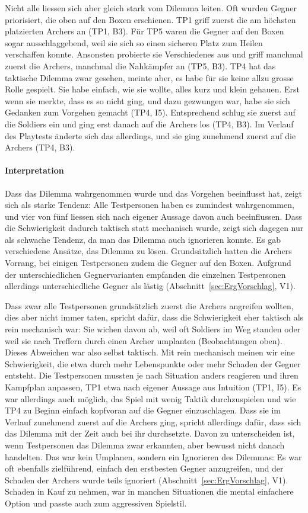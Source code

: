 \documentclass[../Main.tex]{subfiles}
\begin{document}
Nicht alle liessen sich aber gleich stark vom Dilemma leiten. Oft wurden Gegner priorisiert, die oben auf den Boxen erschienen. TP1 griff zuerst die am höchsten platzierten Archers an (TP1, B3). Für TP5 waren die Gegner auf den Boxen sogar ausschlaggebend, weil sie sich so einen sicheren Platz zum Heilen verschaffen konnte. Ansonsten probierte sie Verschiedenes aus und griff manchmal zuerst die Archers, manchmal die Nahkämpfer an (TP5, B3). TP4 hat das taktische Dilemma zwar gesehen, meinte aber, es habe für sie keine allzu grosse Rolle gespielt. Sie habe einfach, wie sie wollte, alles kurz und klein gehauen. Erst wenn sie merkte, dass es so nicht ging, und dazu gezwungen war, habe sie sich Gedanken zum Vorgehen gemacht (TP4, I5). Entsprechend schlug sie zuerst auf die Soldiers ein und ging erst danach auf die Archers los (TP4, B3). Im Verlauf des Playtests änderte sich das allerdings, und sie ging zunehmend zuerst auf die Archers (TP4, B3).

\paragraph{Interpretation}
Dass das Dilemma wahrgenommen wurde und das Vorgehen beeinflusst hat, zeigt sich als starke Tendenz: Alle Testpersonen haben es zumindest wahrgenommen, und vier von fünf liessen sich nach eigener Aussage davon auch beeinflussen. Dass die Schwierigkeit dadurch taktisch statt mechanisch wurde, zeigt sich dagegen nur als schwache Tendenz, da man das Dilemma auch ignorieren konnte. Es gab verschiedene Ansätze, das Dilemma zu lösen. Grundsätzlich hatten die Archers Vorrang, bei einigen Testpersonen zudem die Gegner auf den Boxen. Aufgrund der unterschiedlichen Gegnervarianten empfanden die einzelnen Testpersonen allerdings unterschiedliche Gegner als lästig (Abschnitt~\ref{sec:ErgVorschlag}, V1).

Dass zwar alle Testpersonen grundsätzlich zuerst die Archers angreifen wollten, dies aber nicht immer taten, spricht dafür, dass die Schwierigkeit eher taktisch als rein mechanisch war: Sie wichen davon ab, weil oft Soldiers im Weg standen oder weil sie nach Treffern durch einen Archer umplanten (Beobachtungen oben). Dieses Abweichen war also selbst taktisch. Mit rein mechanisch meinen wir eine Schwierigkeit, die etwa durch mehr Lebenspunkte oder mehr Schaden der Gegner entsteht. Die Testpersonen mussten je nach Situation anders reagieren und ihren Kampfplan anpassen, TP1 etwa nach eigener Aussage aus Intuition (TP1, I5). Es war allerdings auch möglich, das Spiel mit wenig Taktik durchzuspielen und wie TP4 zu Beginn einfach kopfvoran auf die Gegner einzuschlagen. Dass sie im Verlauf zunehmend zuerst auf die Archers ging, spricht allerdings dafür, dass sich das Dilemma mit der Zeit auch bei ihr durchsetzte. Davon zu unterscheiden ist, wenn Testpersonen das Dilemma zwar erkannten, aber bewusst nicht danach handelten. Das war kein Umplanen, sondern ein Ignorieren des Dilemmas: Es war oft ebenfalls zielführend, einfach den erstbesten Gegner anzugreifen, und der Schaden der Archers wurde teils ignoriert (Abschnitt~\ref{sec:ErgVorschlag}, V1). Schaden in Kauf zu nehmen, war in manchen Situationen die mental einfachere Option und passte auch zum aggressiven Spielstil.
\end{document}
